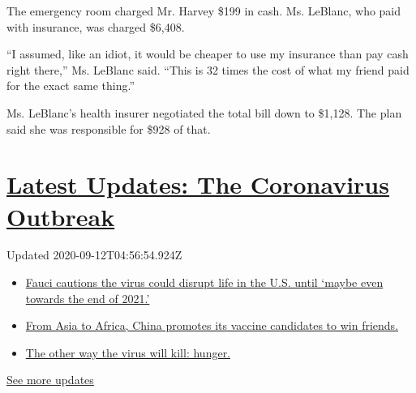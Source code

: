 The emergency room charged Mr. Harvey \$199 in cash. Ms. LeBlanc, who
paid with insurance, was charged \$6,408.

``I assumed, like an idiot, it would be cheaper to use my insurance than
pay cash right there,'' Ms. LeBlanc said. ``This is 32 times the cost of
what my friend paid for the exact same thing.''

Ms. LeBlanc's health insurer negotiated the total bill down to \$1,128.
The plan said she was responsible for \$928 of that.

\hypertarget{latest-updates-the-coronavirus-outbreak}{%
\section{\texorpdfstring{\href{https://www.nytimes3xbfgragh.onion/2020/09/11/world/covid-19-coronavirus.html?action=click\&pgtype=Article\&state=default\&region=MAIN_CONTENT_1\&context=storylines_live_updates}{Latest
Updates: The Coronavirus
Outbreak}}{Latest Updates: The Coronavirus Outbreak}}\label{latest-updates-the-coronavirus-outbreak}}

Updated 2020-09-12T04:56:54.924Z

\begin{itemize}
\tightlist
\item
  \href{https://www.nytimes3xbfgragh.onion/2020/09/11/world/covid-19-coronavirus.html?action=click\&pgtype=Article\&state=default\&region=MAIN_CONTENT_1\&context=storylines_live_updates\#link-dfb8a16}{Fauci
  cautions the virus could disrupt life in the U.S. until `maybe even
  towards the end of 2021.'}
\item
  \href{https://www.nytimes3xbfgragh.onion/2020/09/11/world/covid-19-coronavirus.html?action=click\&pgtype=Article\&state=default\&region=MAIN_CONTENT_1\&context=storylines_live_updates\#link-7104d154}{From
  Asia to Africa, China promotes its vaccine candidates to win friends.}
\item
  \href{https://www.nytimes3xbfgragh.onion/2020/09/11/world/covid-19-coronavirus.html?action=click\&pgtype=Article\&state=default\&region=MAIN_CONTENT_1\&context=storylines_live_updates\#link-393ad215}{The
  other way the virus will kill: hunger.}
\end{itemize}

\href{https://www.nytimes3xbfgragh.onion/2020/09/11/world/covid-19-coronavirus.html?action=click\&pgtype=Article\&state=default\&region=MAIN_CONTENT_1\&context=storylines_live_updates}{See
more updates}

